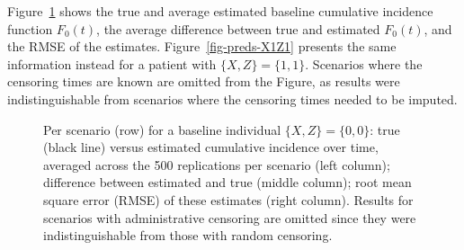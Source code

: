 \documentclass[
  letterpaper,
  paper=240mm:170mm,
  twoside=true,
  open=right,
  fontsize=10pt,
  pagesize=false,
  BCOR=15mm,
  DIV=14,
  headinclude=true,
  footinclude=false,
  headsepline=on]{scrbook}
\begin{document}
Figure~\ref{fig-preds-baseline} shows the true and average estimated
baseline cumulative incidence function \(F_0(t)\), the average
difference between true and estimated \(F_0(t)\), and the RMSE of the
estimates. Figure~\ref{fig-preds-X1Z1} presents the same information
instead for a patient with \(\{X, Z\} = \{1, 1\}\). Scenarios where the
censoring times are known are omitted from the Figure, as results were
indistinguishable from scenarios where the censoring times needed to be
imputed.

\begin{figure}


\caption{\label{fig-preds-baseline}Per scenario (row) for a baseline
individual \(\{X, Z\} = \{0,0\}\): true (black line) versus estimated
cumulative incidence over time, averaged across the 500 replications per
scenario (left column); difference between estimated and true (middle
column); root mean square error (RMSE) of these estimates (right
column). Results for scenarios with administrative censoring are omitted
since they were indistinguishable from those with random censoring.}

\end{figure}%
\end{document}
